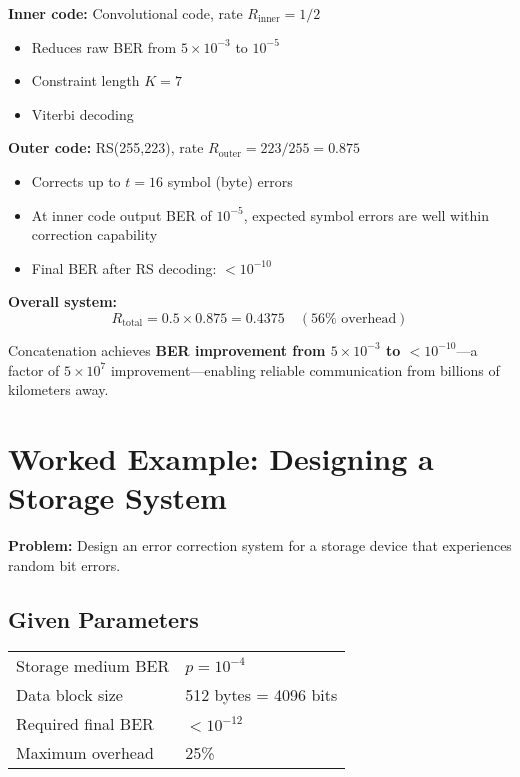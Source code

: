 \textbf{Inner code:} Convolutional code, rate $R_{\text{inner}} = 1/2$
\begin{itemize}
\item Reduces raw BER from $5 \times 10^{-3}$ to $10^{-5}$
\item Constraint length $K = 7$
\item Viterbi decoding
\end{itemize}

\textbf{Outer code:} RS(255,223), rate $R_{\text{outer}} = 223/255 = 0.875$
\begin{itemize}
\item Corrects up to $t = 16$ symbol (byte) errors
\item At inner code output BER of $10^{-5}$, expected symbol errors are well within correction capability
\item Final BER after RS decoding: $< 10^{-10}$
\end{itemize}

\textbf{Overall system:}
\begin{equation}
R_{\text{total}} = 0.5 \times 0.875 = 0.4375 \quad (56\% \text{ overhead})
\end{equation}

\begin{keyconcept}
Concatenation achieves \textbf{BER improvement from $5 \times 10^{-3}$ to $< 10^{-10}$}---a factor of $5 \times 10^{7}$ improvement---enabling reliable communication from billions of kilometers away.
\end{keyconcept}

\section{Worked Example: Designing a Storage System}

\textbf{Problem:} Design an error correction system for a storage device that experiences random bit errors.

\subsection*{Given Parameters}

\begin{tabular}{@{}ll@{}}
Storage medium BER & $p = 10^{-4}$ \\
Data block size & 512 bytes = 4096 bits \\
Required final BER & $< 10^{-12}$ \\
Maximum overhead & 25\% \\
\end{tabular}

